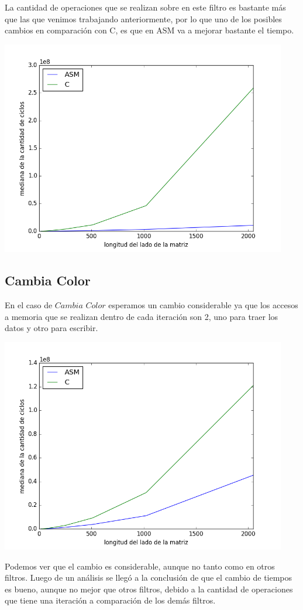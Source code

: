 La cantidad de operaciones que se realizan sobre en este filtro es bastante más que las que venimos trabajando anteriormente, por lo que uno de los posibles cambios en comparación con C, es que en ASM va a mejorar bastante el tiempo.


\vspace{6px}
\begin{center}
\includegraphics[width=12.5cm, height=9
cm]{images/car_edgeSobel.png}
\end{center}
\vspace{6px}





\subsection{Cambia Color}

En el caso de $Cambia$ $Color$ esperamos un cambio considerable ya que los accesos a memoria que se realizan dentro de cada iteración son 2, uno para traer los datos y otro para escribir. 

\vspace{6px}
\begin{center}
\includegraphics[width=12.5cm, height=9
cm]{images/car_cambiaColor.png}
\end{center}
\vspace{6px}

Podemos ver que el cambio es considerable, aunque no tanto como en otros filtros. Luego de un análisis se llegó a la conclusión de que el cambio de tiempos es bueno, aunque no mejor que otros filtros, debido a la cantidad de operaciones que tiene una iteración a comparación de los demás filtros. 